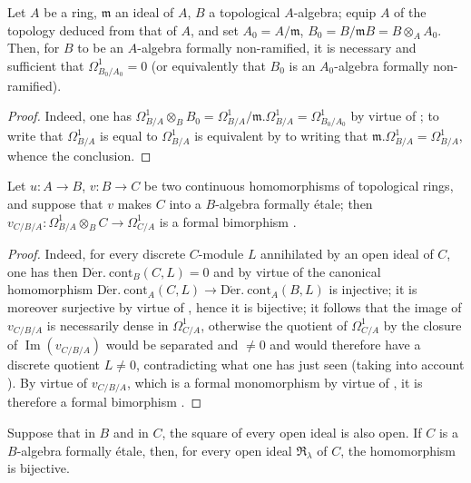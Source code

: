 \begin{corollary}[20.7.5]
\label{0.20.7.5}
Let $A$ be a ring, $\mathfrak{m}$ an ideal of $A$, $B$ a topological $A$-algebra; equip $A$ of the topology deduced from that of $A$, and set $A_0=A/\mathfrak{m}$, $B_0=B/\mathfrak{m}B=B\otimes_A A_0$.
Then, for $B$ to be an $A$-algebra formally non-ramified, it is necessary and sufficient that $\Omega^1_{B_0/A_0}=0$ \textup{(}or equivalently that $B_0$ is an $A_0$-algebra formally non-ramified\textup{)}.
\end{corollary}

\begin{proof}
Indeed, one has $\Omega^1_{B/A}\otimes_B B_0=\Omega^1_{B/A}/\mathfrak{m}.\Omega^1_{B/A}=\Omega^1_{B_0/A_0}$ by virtue of ; to write that $\Omega^1_{B/A}$ is equal to $\Omega^1_{B/A}$ is equivalent by  to writing that $\mathfrak{m}.\Omega^1_{B/A}=\Omega^1_{B/A}$, whence the conclusion.
\end{proof}

\begin{proposition}[20.7.6]
\label{0.20.7.6}
Let $u:A\to B$, $v:B\to C$ be two continuous homomorphisms of topological rings, and suppose that $v$ makes $C$ into a $B$-algebra formally \'{e}tale; then $v_{C/B/A}:\Omega^1_{B/A}\otimes_B C\to\Omega^1_{C/A}$ is a formal bimorphism .
\end{proposition}

\begin{proof}
Indeed, for every discrete $C$-module $L$ annihilated by an open ideal of $C$, one has then  $\operatorname{D\acute{e}r.\ cont}_B(C,L)=0$ and by virtue of  the canonical homomorphism
$\operatorname{D\acute{e}r.\ cont}_A(C,L)\to\operatorname{D\acute{e}r.\ cont}_A(B,L)$ is injective; it is moreover surjective by virtue of , hence it is bijective; it follows that the image of $v_{C/B/A}$ is necessarily dense in $\Omega^1_{C/A}$, otherwise the quotient of $\Omega^1_{C/A}$ by the closure of $\operatorname{Im}(v_{C/B/A})$ would be separated and $\neq 0$ and would therefore have a discrete quotient $L\neq 0$, contradicting what one has just seen (taking into account ).
By virtue of $v_{C/B/A}$, which is a formal monomorphism by virtue of , it is therefore a formal bimorphism .
\end{proof}

\begin{corollary}[20.7.7]
\label{0.20.7.7}
Suppose that in $B$ and in $C$, the square of every open ideal is also open.
If $C$ is a $B$-algebra formally \'{e}tale, then, for every open ideal $\mathfrak{R}_\lambda$ of $C$, the homomorphism  is bijective.
\end{corollary}

